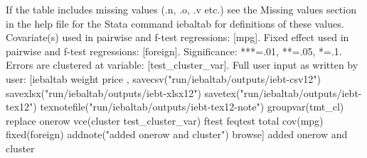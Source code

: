 If the table includes missing values (.n, .o, .v etc.) see the Missing values section in the help file for the Stata command iebaltab for definitions of these values. Covariate(s) used in pairwise and f-test regressions: [mpg]. Fixed effect used in pairwise and f-test regressions: [foreign]. Significance: ***=.01, **=.05, *=.1. Errors are clustered at variable: [test\_cluster\_var]. Full user input as written by user: [iebaltab weight price , savecsv("run/iebaltab/outputs/iebt-csv12") savexlsx("run/iebaltab/outputs/iebt-xlsx12") savetex("run/iebaltab/outputs/iebt-tex12") texnotefile("run/iebaltab/outputs/iebt-tex12-note") groupvar(tmt\_cl) replace onerow vce(cluster test\_cluster\_var) ftest feqtest total cov(mpg) fixed(foreign) addnote("added onerow and cluster") browse] added onerow and cluster
